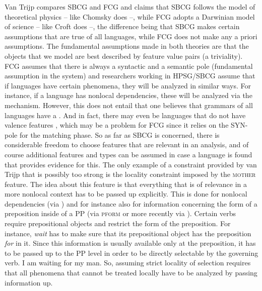 
Van Trijp compares SBCG and FCG and claims that SBCG follows the model of theoretical physics --
like Chomsky does --, while FCG adopts a Darwinian model of science -- like Croft does --, the difference
being that SBCG makes certain assumptions that are true of all languages, while FCG does not make
any a priori assumptions. The fundamental assumptions made in both theories are that the
objects that we model are best described by feature value pairs (a triviality). FCG assumes that
there is always a syntactic and a semantic pole (fundamental assumption in the system) and
researchers working in HPSG/SBCG assume that if languages have certain phenomena, they will be
analyzed in similar ways. For instance, if a language has nonlocal dependencies, these will be
analyzed via the \slasch mechanism. However, this does not entail that one believes that grammars of
all languages have a \slashf. And in fact, there may even be languages that do not have valence
features \citep{KM2010a-u}, which may be a problem for FCG since it relies on the SYN-pole for the
matching phase. So as far as SBCG is concerned, there is considerable freedom to choose features
that are relevant in an analysis, and of course additional features and types can be assumed in case
a language is found that provides evidence for this. The only example of a constraint provided by van Trijp that is possibly too strong
 is the locality constraint imposed by the \textsc{mother}
feature. The idea about this feature is that everything that is of relevance in a more nonlocal
context has to be passed up explicitly. This is done for nonlocal dependencies (via \slasch) and for instance also
for information concerning the form of a preposition inside of a PP (via \textsc{pform} or more
recently via \form). Certain verbs require prepositional objects and restrict
the form of the preposition. For instance, \emph{wait} has to make sure that its prepositional
object has the preposition \emph{for} in it. Since this information is usually available only at the
preposition, it has to be passed up to the PP level in order to be directly selectable by the
governing verb. 
\ea
I am waiting for my man.
\z 
So, assuming strict locality of selection requires that all phenomena that cannot be treated locally
have to be analyzed by passing information up.
